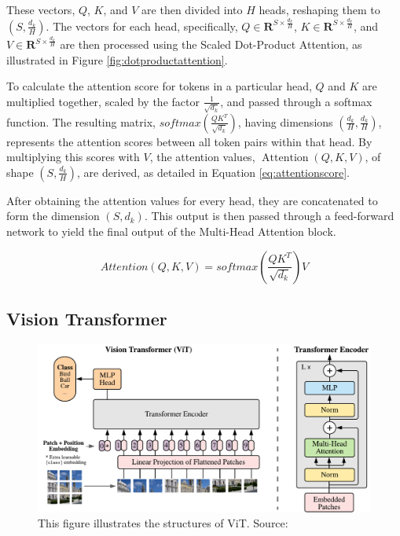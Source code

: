 These vectors, $Q$, $K$, and $V$ are then divided into $H$ heads, reshaping them to $(S, \frac{d_k}{H})$. The vectors for each head, specifically, $Q \in \mathbf{R}^{S \times \frac{d_k}{H}}$, $K \in \mathbf{R}^{S \times \frac{d_k}{H}}$, and $V \in \mathbf{R}^{S \times \frac{d_k}{H}}$ are then processed using the Scaled Dot-Product Attention, as illustrated in Figure \ref{fig:dotproductattention}. 

To calculate the attention score for tokens in a particular head, $Q$ and $K$ are multiplied together, scaled by the factor $\frac{1}{\sqrt{d_k}}$, and passed through a softmax function. The resulting matrix, $softmax\left(\frac{Q K^T}{\sqrt{d_k}}\right)$, having dimensions $(\frac{d_k}{H}, \frac{d_k}{H})$, represents the attention scores between all token pairs within that head. By multiplying this scores with $V$, the attention values, $\operatorname{Attention}(Q, K, V)$, of shape $(S, \frac{d_k}{H})$, are derived, as detailed in Equation \ref{eq:attentionscore}.
 
After obtaining the attention values for every head, they are concatenated to form the dimension $(S, d_k)$. This output is then passed through a feed-forward network to yield the final output of the Multi-Head Attention block.

\begin{equation}
    Attention(Q, K, V)=softmax\left(\frac{Q K^T}{\sqrt{d_k}}\right) V
    \label{eq:attentionscore}
\end{equation}

\subsection{Vision Transformer}

\begin{figure}[ht]
    \centering
    \includegraphics[width=1.0\textwidth]{assets/charts_rw/ViT}
    \caption[Illustration of ViT's Structures]{This figure illustrates the structures of ViT. Source: \parencite{dosovitskiy2020image}}
    \label{fig:structuresvit}
\end{figure}


